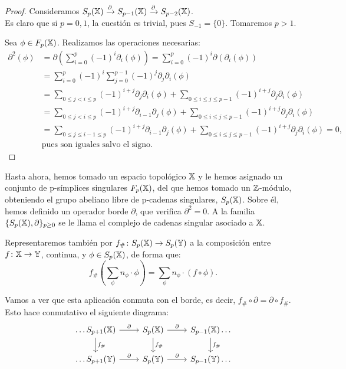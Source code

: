 \begin{proof}
  Consideramos $S_p({\mathbb X}) \xrightarrow{\partial} S_{p-1}({\mathbb X}) \xrightarrow{\partial} S_{p-2}({\mathbb X})$. \\
  Es claro que si $p = 0, 1$, la cuestión es trivial, pues $S_{-1} = \{0\}$. Tomaremos $p > 1$.

  Sea $\phi \in F_{p}({\mathbb X})$. Realizamos las operaciones necesarias:
  \begin{align*}
    \partial^2(\phi) &= \partial(\sum_{i = 0}^p (-1)^i \partial_i(\phi)) = \sum_{i = 0}^p (-1)^i \partial(\partial_i(\phi)) \\
                     &= \sum_{i = 0}^p (-1)^i \sum_{j = 0}^{p-1} (-1)^j \partial_j \partial_i(\phi) \\
                     &= \sum_{0 \leq j < i \leq p} (-1)^{i + j} \partial_j \partial_i(\phi)
                        + \sum_{0 \leq i \leq j \leq p-1} (-1)^{i + j} \partial_j \partial_i(\phi) \\
                     &= \sum_{0 \leq j < i \leq p} (-1)^{i + j} \partial_{i-1} \partial_j(\phi)
                        + \sum_{0 \leq i \leq j \leq p-1} (-1)^{i + j} \partial_j \partial_i(\phi) \\
                     &= \sum_{0 \leq j \leq i-1 \leq p} (-1)^{i + j} \partial_{i-1} \partial_j(\phi)
                        + \sum_{0 \leq i \leq j \leq p-1} (-1)^{i + j} \partial_j \partial_i(\phi) = 0,\\
                     &\text{pues son iguales salvo el signo.}
  \end{align*}
\end{proof}

Hasta ahora, hemos tomado un espacio topológico ${\mathbb X}$ y le hemos asignado un conjunto de p-símplices singulares $F_{p}({\mathbb X})$, del que
hemos tomado un $\mathbb{Z}$-módulo, obteniendo el grupo abeliano libre de p-cadenas singulares, $S_p({\mathbb X})$. Sobre él, hemos definido un
operador borde $\partial$, que verifica $\partial^2 = 0$. A la familia $\{S_p({\mathbb X}), \partial\}_{p \geq 0}$ se le llama el complejo de cadenas
singular asociado a ${\mathbb X}$.

Representaremos también por $f_\# \colon S_p({\mathbb X}) \to S_p({\mathbb Y})$ a la composición entre
$f \colon {\mathbb X} \to {\mathbb Y}$, continua, y $\phi \in S_p({\mathbb X})$, de forma que:
\[ f_\#(\sum_\phi n_\phi \cdot \phi) = \sum_\phi n_\phi \cdot (f \circ \phi). \]

Vamos a ver que esta aplicación conmuta con el borde, es decir, $f_\# \circ \partial = \partial \circ f_\#$. Esto hace conmutativo el siguiente diagrama:
\[
  \begin{tikzcd}
    \dots S_{p+1}(\X) \arrow{r}{\partial} \arrow{d}{f_\#} & S_p(\X) \arrow{r}{\partial} \arrow{d}{f_\#} & S_{p-1}(\X) \arrow{d}{f_\#} \dots \\
    \dots S_{p+1}(\Y) \arrow{r}{\partial}                 & S_p(\Y) \arrow{r}{\partial}                 & S_{p-1}(\Y) \dots
  \end{tikzcd}
\]

